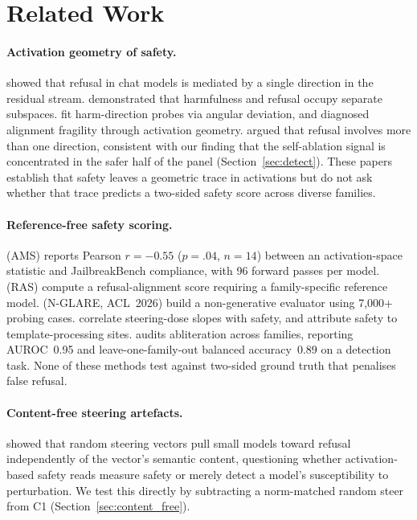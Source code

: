 \documentclass[11pt,letterpaper]{article}
\begin{document}
\section{Related Work}

\paragraph{Activation geometry of safety.}
\citet{Arditi2024} showed that refusal in chat models is mediated by a
single direction in the residual stream. \citet{Zhao2025} demonstrated
that harmfulness and refusal occupy separate subspaces.
\citet{LlorenteSaguer2026a, LlorenteSaguer2026b} fit harm-direction
probes via angular deviation, and \citet{Lee2026} diagnosed alignment
fragility through activation geometry. \citet{Joad2026} argued that
refusal involves more than one direction, consistent with our finding
that the self-ablation signal is concentrated in the safer half of the
panel (Section~\ref{sec:detect}). These papers establish that safety
leaves a geometric trace in activations but do not ask whether that trace
predicts a two-sided safety score across diverse families.

\paragraph{Reference-free safety scoring.}
\citet{Messenger2026} (AMS) reports Pearson $r = -0.55$
($p = .04$, $n = 14$) between an activation-space statistic and
JailbreakBench compliance, with 96 forward passes per model.
\citet{Huang2026} (RAS) compute a refusal-alignment score requiring a
family-specific reference model. \citet{Lin2025} (N-GLARE, ACL~2026)
build a non-generative evaluator using 7,000+ probing cases.
\citet{Li2026} correlate steering-dose slopes with safety, and
\citet{Leong2025} attribute safety to template-processing sites.
\citet{Hurtado2026} audits abliteration across families, reporting
AUROC~0.95 and leave-one-family-out balanced accuracy~0.89 on a
detection task. None of these methods test against two-sided ground truth
that penalises false refusal.

\paragraph{Content-free steering artefacts.}
\citet{Malla2026} showed that random steering vectors pull small models
toward refusal independently of the vector's semantic content, questioning
whether activation-based safety reads measure safety or merely detect a
model's susceptibility to perturbation. We test this directly by
subtracting a norm-matched random steer from C1
(Section~\ref{sec:content_free}).
\end{document}
